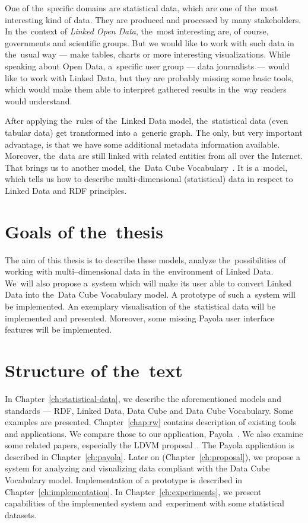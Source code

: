 One of the~specific domains are statistical data, which are one of the~most interesting kind
of data. They are produced and processed by many stakeholders. In the~context of
\emph{Linked Open Data}, the~most interesting are, of course, governments and scientific groups.
But we would like to work with such data in the~usual
way --- make tables, charts or more interesting visualizations. While speaking about Open Data, a~specific
user group --- data journalists --- would like to work with Linked Data, but they are probably
missing some basic tools, which would make them able to interpret gathered results
in the~way readers would understand.

After applying the~rules of the~Linked Data model, the~statistical data (even tabular data)
get transformed into a~generic graph. The only, but very important advantage, is that we have some additional
metadata information available. Moreover, the~data are still linked with related entities from all over the Internet.
That brings
us to another model, the~Data Cube Vocabulary~\cite{dcv}. It is a~model, which tells us how to describe
multi-dimensional (statistical) data in respect to Linked Data and RDF 
principles.

\section{Goals of the~thesis}

The aim of this thesis is to describe these models, analyze the~possibilities of 
working
with multi--dimensional data in the~environment of Linked Data. We~will also propose a~system
which will make its user able to convert Linked Data into the~Data Cube Vocabulary model.
A prototype of such a~system will be implemented. An exemplary visualisation of the~statistical
data will be implemented and presented. Moreover, some missing Payola user interface features 
will be implemented.

\section{Structure of the~text}
In Chapter~\ref{ch:statistical-data}, we describe the aforementioned 
models and standards --- RDF, Linked Data, Data Cube and Data Cube Vocabulary. 
Some examples are presented. Chapter~\ref{chap:rw} contains description of 
existing tools and applications. We compare those to our application, Payola~\cite{payola}.
We also examine some related papers, especially the LDVM proposal~\cite{ldvm}. 
The Payola application is described in Chapter~\ref{ch:payola}. Later on (Chapter~\ref{ch:proposal}),
we propose a system
for analyzing and visualizing data compliant with the Data Cube Vocabulary model.
Implementation of a prototype is described in Chapter~\ref{ch:implementation}.
In Chapter~\ref{ch:experiments}, we present capabilities of the implemented system
and~experiment with some statistical datasets.